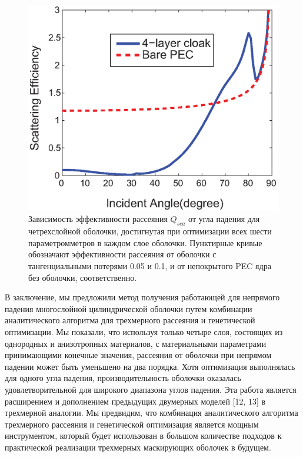 \documentclass[a4paper, 12pt]{article}
\begin{document}
\begin{figure}
\centering
\includegraphics[width=0.5\columnwidth,draft=false]{Fig_3}
\caption{\label{fig:sca} Зависимость эффективности рассеяния $Q_{sca}$ 
от угла падения для четрехслойной оболочки, достигнутая при оптимизации
всех шести параметромметров в каждом слое оболочки. Пунктирные кривые обозначают
эффективности рассеяния от оболочки с тангенциальными потерями 0.05 и 0.1, и
от непокрытого PEC ядра без оболочки, соответственно.}
\end{figure}

В заключение, мы предложили метод получения работающей для непрямого падения
многослойной цилиндрической оболочки путем комбинации аналитического алгоритма 
для трехмерного рассеяния и генетической оптимизации. Мы показали, что
используя только четыре слоя, состоящих из однородных и анизотропных
материалов, с материальными параметрами принимающими конечные значения,
рассеяния от оболочки при непрямом падении может быть уменьшено на два порядка.
Хотя оптимизация выполнялась для одного угла падения, производительность
оболочки оказалась удовлетворительной для широкого диапазона углов падения.
Эта работа является расширением и дополнением предыдущих двумерных моделей
[12, 13] в трехмерной аналогии. Мы предвидим, что комбинация аналитического 
алгоритма трехмерного рассеяния и генетической оптимизация является мощным
инструментом, который будет использован в большом количестве подходов
к практической реализации трехмерных маскирующих оболочек в будущем.
\end{document}
